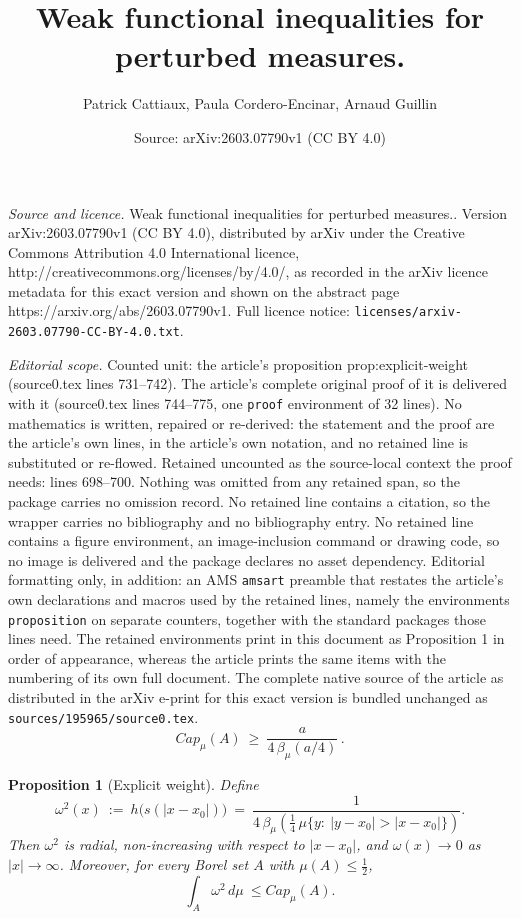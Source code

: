 \documentclass[10pt,a4paper]{amsart}
\title{Weak functional inequalities for perturbed measures.}
\author{Patrick Cattiaux, Paula Cordero-Encinar, Arnaud Guillin}
\date{Source: arXiv:2603.07790v1 (CC BY 4.0)}
\newtheorem{proposition}{Proposition}
\begin{document}
\maketitle

\noindent\emph{Source and licence.} Weak functional inequalities for perturbed measures.. Version arXiv:2603.07790v1 (CC BY 4.0), distributed by arXiv under the Creative Commons Attribution 4.0 International licence, http://creativecommons.org/licenses/by/4.0/, as recorded in the arXiv licence metadata for this exact version and shown on the abstract page https://arxiv.org/abs/2603.07790v1. Full licence notice: \texttt{licenses/arxiv-2603.07790-CC-BY-4.0.txt}.\par\smallskip

\noindent\textit{Editorial scope.} Counted unit: the article's proposition prop:explicit-weight (source0.tex lines 731--742). The article's complete original proof of it is delivered with it (source0.tex lines 744--775, one \texttt{proof} environment of 32 lines). No mathematics is written, repaired or re-derived: the statement and the proof are the article's own lines, in the article's own notation, and no retained line is substituted or re-flowed.  Retained uncounted as the source-local context the proof needs: lines 698--700.  Nothing was omitted from any retained span, so the package carries no omission record.  No retained line contains a citation, so the wrapper carries no bibliography and no bibliography entry.  No retained line contains a figure environment, an image-inclusion command or drawing code, so no image is delivered and the package declares no asset dependency.  Editorial formatting only, in addition: an AMS \texttt{amsart} preamble that restates the article's own declarations and macros used by the retained lines, namely the environments \texttt{proposition} on separate counters, together with the standard packages those lines need.  The retained environments print in this document as Proposition 1 in order of appearance, whereas the article prints the same items with the numbering of its own full document.  The complete native source of the article as distributed in the arXiv e-print for this exact version is bundled unchanged as \texttt{sources/195965/source0.tex}.
\begin{equation}\label{eq:cap-lower}
  Cap_\mu(A)\ \ge\ \frac{a}{4\,\beta_\mu(a/4)} \, .
\end{equation}

\begin{proposition}[Explicit weight]\label{prop:explicit-weight}
Define
\begin{equation}\label{eq:omega-explicit}
  \omega^2(x)\ :=\ h\bigl(s(|x-x_0|)\bigr)
  \ =\ \frac{1}{4\,\beta_\mu\!\left(\tfrac14\,\mu\{y:\ |y-x_0|>|x-x_0|\}\right)}.
\end{equation}
Then $\omega^2$ is radial, non-increasing with respect to $|x-x_0|$, and $\omega(x)\to0$ as $|x|\to\infty$.
Moreover, for every Borel set $A$ with $\mu(A)\le\tfrac12$,
\begin{equation}\label{eq:nu-cap-small}
  \int_A \omega^2\,d\mu \ \le Cap_\mu(A).
\end{equation}
\end{proposition}
\end{document}

